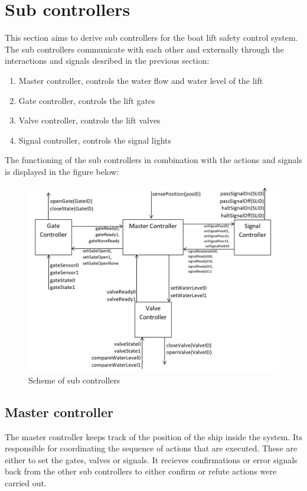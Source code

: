 \section{Sub controllers}
This section aims to derive sub controllers for the boat lift safety control system. The sub controllers communicate with each other and externally through the interactions and signals desribed in the previous section:

\begin{enumerate}
	\item Master controller, controls the water flow and water level of the lift
	\item Gate controller, controls the lift gates
	\item Valve controller, controls the lift valves
	\item Signal controller, controls the signal lights
\end{enumerate}

\noindent The functioning of the sub controllers in combination with the actions and signals is displayed in the figure below:

\begin{figure}[!h]
	\includegraphics[width=\linewidth]{controllers}
	\caption{Scheme of sub controllers}
	\label{fig:subcontrollers}
\end{figure}
\subsection{Master controller}
The master controller keeps track of the position of the ship inside the system. Its responsible for coordinating the sequence of actions that are executed. These are either to set the gates, valves or signals. It recieves confirmations or error signals back from the other sub controllers to either confirm or refute actions were carried out. \\


